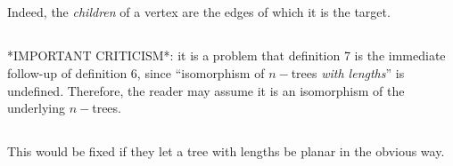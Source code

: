 \documentclass{amsart}
\begin{document}
\subsection*{} Indeed, the \emph{children} of a vertex are the edges of
which it is the target.


\subsection{} *IMPORTANT CRITICISM*: it is a problem that definition 7 is
the immediate follow-up of definition 6, since ``isomorphism of $n-$trees
\emph{with lengths}'' is undefined. Therefore, the reader may assume it is
an isomorphism of the underlying $n-$trees.

\subsection{} This would be fixed if they let a tree with lengths be planar
in the obvious way.



\end{document}
